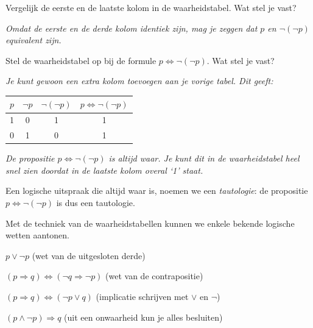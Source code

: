 \begin{werktekstoef}
\setcounter{enumi}{2} 
\item{Vergelijk de eerste en de laatste kolom in de waarheidstabel. Wat stel je vast?}

\emph{Omdat de eerste en de derde kolom identiek zijn, mag je zeggen dat $p$ en $\lnot (\lnot p)$ equivalent zijn.}
\end{werktekstoef}

\begin{werktekstoef}
\setcounter{enumi}{3} 
\item{Stel de waarheidstabel op bij de formule $p \Leftrightarrow \lnot (\lnot p)$. Wat stel je vast?}

\emph{Je kunt gewoon een extra kolom toevoegen aan je vorige tabel. Dit geeft:}

\begin{center}
\begin{tabular}{c|c|c|c}  
$p$ & $\lnot p$ & $\lnot (\lnot p)$ & $p \Leftrightarrow \lnot (\lnot p)$\\
\hline
1 & 0 & 1 &1\\
0 & 1 & 0 &1
\end{tabular}
\end{center}

\emph{De propositie $p \Leftrightarrow \lnot (\lnot p)$ is altijd waar. Je kunt dit in de waarheidstabel heel snel zien doordat in de laatste kolom overal `1' staat.}
\end{werktekstoef}

Een logische uitspraak die altijd waar is, noemen we een \emph{tautologie}: de propositie $p \Leftrightarrow \lnot (\lnot p)$ is dus een tautologie.

Met de techniek van de waarheidstabellen kunnen we enkele bekende logische wetten aantonen. 

\begin{opsomming}
\item $p \lor \lnot p$ (wet van de uitgesloten derde)
\item $(p \Rightarrow q) \Leftrightarrow (\lnot q \Rightarrow \lnot p)$ (wet van de contrapositie)
\item $(p \Rightarrow q) \Leftrightarrow (\lnot p \lor q)$ (implicatie schrijven met $\lor$ en $\lnot$)
\item $(p \land \lnot p) \Rightarrow q$ (uit een onwaarheid kun je alles besluiten) 
\end{opsomming}

